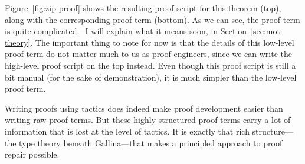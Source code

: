 Figure~\ref{fig:zip-proof} shows the resulting proof script for this theorem (top), along with the corresponding proof term (bottom).
As we can see, the proof term is quite complicated---I will explain what it means soon, in Section~\ref{sec:mot-theory}.
The important thing to note for now is that the details of this low-level proof term do not matter much to us as proof engineers,
since we can write the high-level proof script on the top instead.
Even though this proof script is still a bit manual (for the sake of demonstration),
it is much simpler than the low-level proof term.

Writing proofs using tactics does indeed make proof development easier than writing raw proof terms.
But these highly structured proof terms carry a lot of information that is lost at the level of tactics.
It is exactly that rich structure---the type theory beneath Gallina---that makes a principled approach to proof repair possible.





